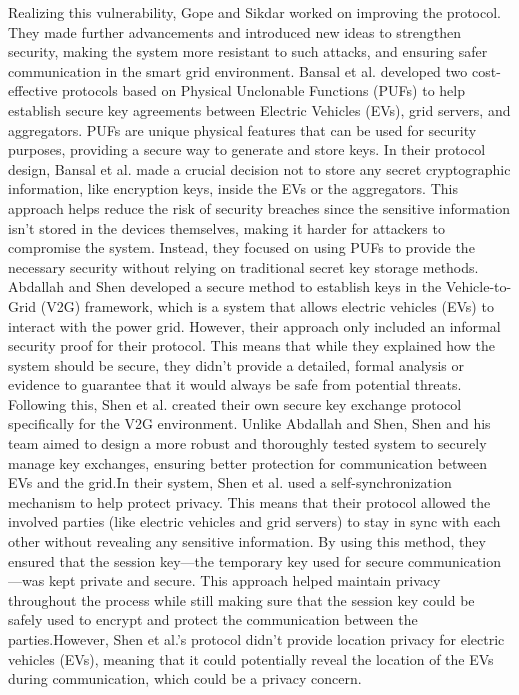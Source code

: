 \documentclass[3p,times,onecolumn]{elsarticle}
\begin{document}
Realizing this vulnerability, Gope and Sikdar worked on improving the protocol. They made further advancements and introduced new ideas to strengthen security, making the system more resistant to such attacks, and ensuring safer communication in the smart grid environment. 
Bansal et al. \cite{GT12} developed two cost-effective protocols based on Physical Unclonable Functions (PUFs) to help establish secure key agreements between Electric Vehicles (EVs), grid servers, and aggregators. PUFs are unique physical features that can be used for security purposes, providing a secure way to generate and store keys. In their protocol design\cite{GT12}, Bansal et al. made a crucial decision not to store any secret cryptographic information, like encryption keys, inside the EVs or the aggregators. This approach helps reduce the risk of security breaches since the sensitive information isn't stored in the devices themselves, making it harder for attackers to compromise the system. Instead, they focused on using PUFs to provide the necessary security without relying on traditional secret key storage methods.
Abdallah and Shen \cite{GT8} developed a secure method to establish keys in the Vehicle-to-Grid (V2G) framework, which is a system that allows electric vehicles (EVs) to interact with the power grid. However, their approach only included an informal security proof for their protocol. This means that while they explained how the system should be secure, they didn't provide a detailed, formal analysis or evidence to guarantee that it would always be safe from potential threats.
Following this, Shen et al. \cite{GT9} created their own secure key exchange protocol specifically for the V2G environment. Unlike Abdallah and Shen, Shen and his team aimed to design a more robust and thoroughly tested system to securely manage key exchanges, ensuring better protection for communication between EVs and the grid.In their system, Shen et al. \cite{GT9} used a self-synchronization mechanism to help protect privacy. This means that their protocol allowed the involved parties (like electric vehicles and grid servers) to stay in sync with each other without revealing any sensitive information. By using this method, they ensured that the session key—the temporary key used for secure communication—was kept private and secure. This approach helped maintain privacy throughout the process while still making sure that the session key could be safely used to encrypt and protect the communication between the parties.However, Shen et al.'s protocol didn't provide location privacy for electric vehicles (EVs), meaning that it could potentially reveal the location of the EVs during communication, which could be a privacy concern.
\end{document}
